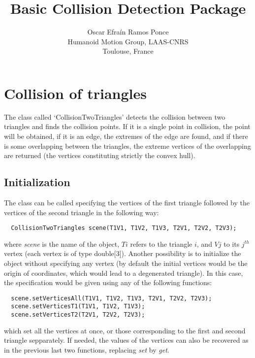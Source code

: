 \documentclass[11pt,a4paper]{article}
\title{\textbf{Basic Collision Detection Package}}
\author{Oscar Efra\'{i}n Ramos Ponce \\
  Humanoid Motion Group, LAAS-CNRS \\
  Toulouse, France}
\date{}
\begin{document}
\maketitle


\section{Collision of triangles}

The class called `CollisionTwoTriangles' detects the collision between two triangles and finds the collision points. If it is a single point in collision, the point will be obtained, if it is an edge, the extremes of the edge are found, and if there is some overlapping between the triangles, the extreme vertices of the overlapping are returned (the vertices constituting strictly the convex hull).

\subsection*{Initialization}
The class can be called specifying the vertices of the first triangle followed by the vertices of the second triangle in the following way: 
  \begin{lstlisting}
  CollisionTwoTriangles scene(T1V1, T1V2, T1V3, T2V1, T2V2, T2V3);
  \end{lstlisting}
where \textit{scene} is the name of the object, $Ti$ refers to the triangle $i$, and $Vj$ to its $j^{th}$ vertex (each vertex is of type double[3]). Another possibility is to initialize the object without specifying any vertex (by default the initial vertices would be the origin of coordinates, which would lead to a degenerated triangle). In this case, the specification would be given using any of the following functions:
\begin{lstlisting}
  scene.setVerticesAll(T1V1, T1V2, T1V3, T2V1, T2V2, T2V3);
  scene.setVerticesT1(T1V1, T1V2, T1V3);
  scene.setVerticesT2(T2V1, T2V2, T2V3);
\end{lstlisting}
which set all the vertices at once, or those corresponding to the first and second triangle sepparately. If needed, the values of the vertices can also be recovered as in the previous last two functions, replacing \textit{set} by \textit{get}.
\end{document}
